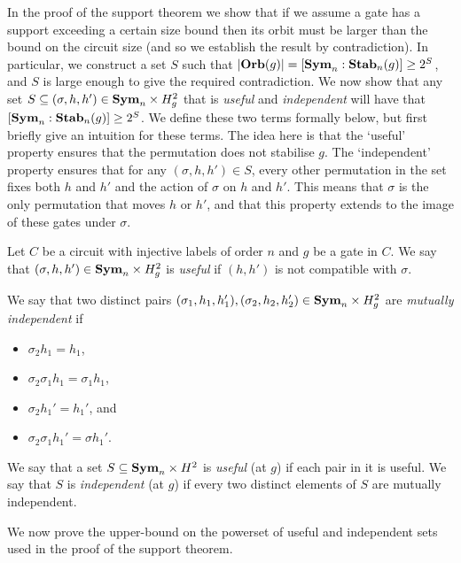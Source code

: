 \documentclass[../paper.tex]{subfiles}
\begin{document}
In the proof of the support theorem we show that if we assume a gate has a
support exceeding a certain size bound then its orbit must be larger than the
bound on the circuit size (and so we establish the result by contradiction). In
particular, we construct a set $S$ such that $\vert \text{\textbf{Orb}}(g) \vert = [\text{\textbf{Sym}}_n :
\text{\textbf{Stab}}_n(g)] \geq 2^S$, and $S$ is large enough to give the required
contradiction. We now show that any set $S \subseteq (\sigma, h, h') \in \text{\textbf{Sym}}_n
\times H^2_g$ that is \emph{useful} and \emph{independent} will have that
$[\text{\textbf{Sym}}_n : \text{\textbf{Stab}}_n(g)] \geq 2^S$. We define these two terms formally below, but
first briefly give an intuition for these terms. The idea here is that the
`useful' property ensures that the permutation does not stabilise $g$. The
`independent' property ensures that for any $(\sigma, h, h') \in S$, every other
permutation in the set fixes both $h$ and $h'$ and the action of $\sigma$ on $h$
and $h'$. This means that $\sigma$ is the only permutation that moves $h$ or
$h'$, and that this property extends to the image of these gates under $\sigma$.

\begin{definition}
  Let $C$ be a circuit with injective labels of order $n$ and $g$ be a gate in
  $C$. We say that $(\sigma, h, h') \in \text{\textbf{Sym}}_n \times H^2_g$ is \emph{useful} if
  $(h, h')$ is not compatible with $\sigma$.

  We say that two distinct pairs $(\sigma_1, h_1, h_1'), (\sigma_2, h_2, h_2')
  \in \text{\textbf{Sym}}_n\times H^2_g$ are \emph{mutually independent} if
  \begin{itemize}
    \setlength\itemsep{0mm}
  \item $\sigma_2 h_1 = h_1$,
  \item $\sigma_2 \sigma_1 h_1 = \sigma_1 h_1$,
  \item $\sigma_2 h_1' = h_1'$, and
  \item $\sigma_2 \sigma_1 h_1' = \sigma h_1'$.
  \end{itemize}
  We say that a set $S \subseteq \text{\textbf{Sym}}_n \times H^2$ is \emph{useful} (at $g$) if
  each pair in it is useful. We say that $S$ is \emph{independent} (at $g$) if
  every two distinct elements of $S$ are mutually independent.
\end{definition}

We now prove the upper-bound on the powerset of useful and independent sets used
in the proof of the support theorem.
\end{document}
